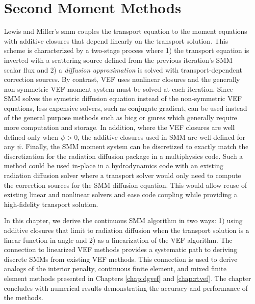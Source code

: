 \documentclass[../doc.tex]{subfiles}
\begin{document}
\chapter{Second Moment Methods} \label{chap:smm}
Lewis and Miller's \gls{smm} \cite{lewis_miller} couples the transport equation to the moment equations with additive closures that depend linearly on the transport solution. This scheme is characterized by a two-stage process where 1) the transport equation is inverted with a scattering source defined from the previous iteration's SMM scalar flux and 2) a \emph{diffusion approximation} is solved with transport-dependent correction sources. By contrast, VEF uses nonlinear closures and the generally non-symmetric VEF moment system must be solved at each iteration. Since SMM solves the symetric diffusion equation instead of the non-symmetric VEF equations, less expensive solvers, such as conjugate gradient, can be used instead of the general purpose methods such as \gls{bicg} or \gls{gmres} which generally require more computation and storage. In addition, where the VEF closures are well defined only when $\psi>0$, the additive closures used in SMM are well-defined for any $\psi$. Finally, the SMM moment system can be discretized to exactly match the discretization for the radiation diffusion package in a multiphysics code. Such a method could be used in-place in a hydrodynamics code with an existing radiation diffusion solver where a transport solver would only need to compute the correction sources for the SMM diffusion equation. 
This would allow reuse of existing linear and nonlinear solvers and ease code coupling while providing a high-fidelity transport solution. 

In this chapter, we derive the continuous SMM algorithm in two ways: 1) using additive closures that limit to radiation diffusion when the transport solution is a linear function in angle and 2) as a linearization of the VEF algorithm. The connection to linearized VEF methods provides a systematic path to deriving discrete SMMs from existing VEF methods. This connection is used to derive analogs of the interior penalty, continuous finite element, and mixed finite element methods presented in Chapters \ref{chap:dgvef} and \ref{chap:rtvef}. The chapter concludes with numerical results demonstrating the accuracy and performance of the methods. 
\end{document}
